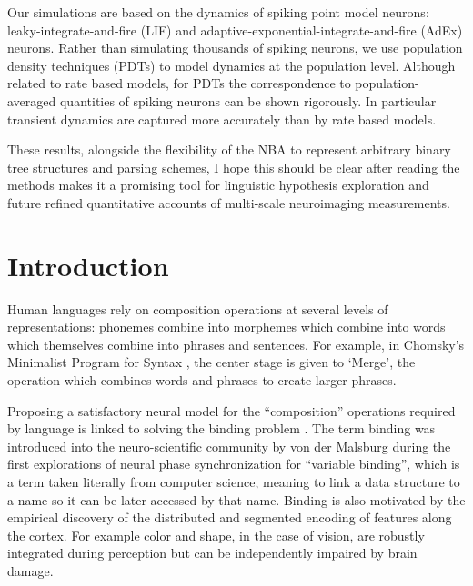 \documentclass[10pt]{article}
\newcommand{\notenewMdK}[2]{}
\newcommand{\notenewMP}[3]{(MP: \textcolor{blue}{#1})}
\begin{document}
Our simulations are based on the dynamics of spiking point model neurons: leaky-integrate-and-fire (LIF) and adaptive-exponential-integrate-and-fire (AdEx) neurons.
Rather than simulating thousands of spiking neurons, we use population density techniques (PDTs) to model dynamics at the population level. Although related to rate based models, 
for PDTs the correspondence to population-averaged quantities of spiking neurons can be shown rigorously.
In particular transient dynamics are captured more accurately than by rate based models.

These results, alongside the flexibility of the NBA to represent arbitrary binary tree structures and parsing schemes, \notenewMdK{This is a strong statement that needs justification later in the paper.} \notenewMP{I hope this should be clear after reading the methods}
makes it a promising tool for linguistic hypothesis exploration and future refined quantitative accounts of multi-scale neuroimaging measurements.


\section{Introduction}

{\label{931947}}

Human languages rely on composition operations at several levels of representations: phonemes combine into morphemes which combine into words which themselves combine into 
phrases and sentences. For example, in Chomsky's Minimalist Program for Syntax \cite{Chomsky_2013}, the center stage is given to `Merge', the operation which combines words and phrases to create larger phrases.

Proposing a satisfactory neural model for the ``composition'' operations required by language is linked to solving the binding problem \cite{marcus14}.
The term binding was introduced into the neuro-scientific community by von der Malsburg\cite{von_der_Malsburg_1994} during the first explorations of neural phase synchronization for ``variable binding'', which is a term taken literally from computer science, meaning to link a data structure to a name so it can be later accessed by that name.
Binding is also motivated by the empirical discovery of the distributed and segmented encoding of features along the cortex. For example color and shape, in the case of vision, are robustly integrated during perception but can be independently impaired by brain damage.
\end{document}
